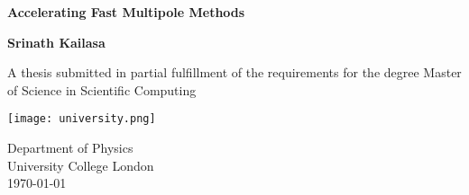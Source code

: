 \begin{titlepage}
    \begin{center}
        \vspace*{1cm}
        
        \Huge
        \textbf{Accelerating Fast Multipole Methods}
        
        \Large
        \vspace{0.5cm}
             
        \vfill
 
        \textbf{Srinath Kailasa}
 
        \vspace{5cm}
             
        A thesis submitted in partial fulfillment of the requirements for the 
        degree Master of Science in Scientific Computing
             
        \vspace{0.8cm}
      
        \texttt{[image: university.png]}
        
        \large
        Department of Physics\\
        University College London\\
        \today
             
    \end{center}
 \end{titlepage}